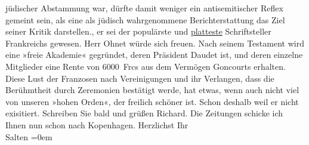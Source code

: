 \begin{ledgroupsized}[t]{13cm}
{{{                  jüdischer Abstammung war, dürfte damit weniger ein antisemitischer Reflex gemeint
                  sein, als eine als jüdisch wahrgenommene Berichterstattung das Ziel seiner Kritik
                  darstellen.}}}\label{K_L03175-44h}, er sei der populärste und \uline{platteste}{ }{\pb}Schriftsteller Frankreichs gewesen. Herr Ohnet würde sich freuen. Nach seinem Testament wird eine »freie Akademie« gegründet, deren Präsident
                  Daudet ist, und deren einzelne Mitglieder
               eine Rente von 6000 Frcs aus dem Vermögen Goncourts erhalten. \pend
           \pstart
           Diese Lust der Franzosen nach Vereinigungen und ihr Verlangen, dass die Berühmtheit
               durch Zeremonien bestätigt werde, hat etwas, wenn auch nicht viel von unseren »hohen
               Orden«, der freilich schöner ist. Schon deshalb weil er nicht exisitiert. Schreiben
               Sie bald und grüßen Richard. Die Zeitungen
               schicke ich Ihnen nun schon nach Kopenhagen. \pend
           \pstart
           Herzlichst Ihr {\\[\baselineskip]}\spacefill\mbox{Salten}\pend
           \leftskip=0em{}
         
         \endnumbering{}\end{ledgroupsized}\begin{anhang}\end{anhang}\newcommand{\dateiname}{L03175}\newcommand{\titel}{Felix Salten an Arthur Schnitzler, 21. 7. 1896}\newcommand{\editorInnen}{Martin Anton Müller und Laura Untner}
      